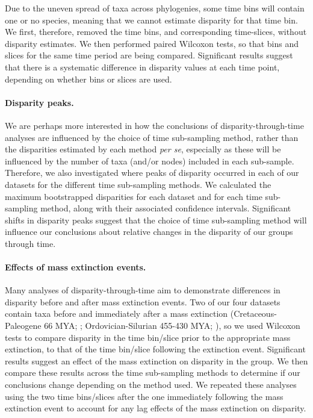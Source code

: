 \documentclass[12pt,a4paper]{article}
\begin{document}
Due to the uneven spread of taxa across phylogenies, some time bins will contain one or no species, meaning that we cannot estimate disparity for that time bin. 
We first, therefore, removed the time bins, and corresponding time-slices, without disparity estimates. 
We then performed paired Wilcoxon tests, so that bins and slices for the same time period are being compared. 
Significant results suggest that there is a systematic difference in disparity values at each time point, depending on whether bins or slices are used.

\paragraph{Disparity peaks.}
We are perhaps more interested in how the conclusions of disparity-through-time analyses are influenced by the choice of time sub-sampling method, rather than the disparities estimated by each method \textit{per se}, especially as these will be influenced by the number of taxa (and/or nodes) included in each sub-sample. 
Therefore, we also investigated where peaks of disparity occurred in each of our datasets for the different time sub-sampling methods. 
We calculated the maximum bootstrapped disparities for each dataset and for each time sub-sampling method, along with their associated confidence intervals.
Significant shifts in disparity peaks suggest that the choice of time sub-sampling method will influence our conclusions about relative changes in the disparity of our groups through time. 

\paragraph{Effects of mass extinction events.}
Many analyses of disparity-through-time aim to demonstrate differences in disparity before and after mass extinction events. 
Two of our four datasets contain taxa before and immediately after a mass extinction (Cretaceous-Paleogene 66 MYA; \citealt{beckancient2014}; Ordovician-Silurian 455-430 MYA; \citealt{wright2017bayesian}), so we used Wilcoxon tests to compare disparity in the time bin/slice prior to the appropriate mass extinction, to that of the time bin/slice following the extinction event. 
Significant results suggest an effect of the mass extinction on disparity in the group.
We then compare these results across the time sub-sampling methods to determine if our conclusions change depending on the method used.
We repeated these analyses using the two time bins/slices after the one immediately following the mass extinction event to account for any lag effects of the mass extinction on disparity.
\end{document}
